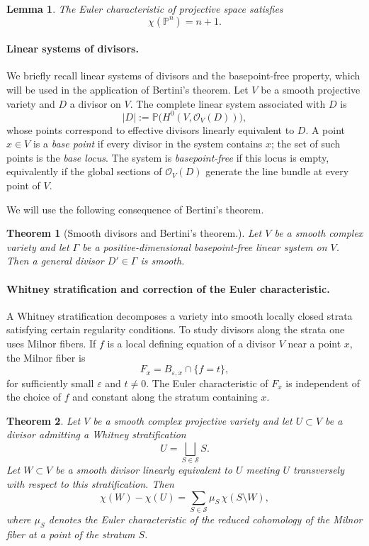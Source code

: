 \documentclass{article}
\newtheorem{theorem}{Theorem}
\newtheorem{lemma}{Lemma}
\newcommand{\PP}{\mathbb{P}}
\begin{document}
\begin{lemma}\cite{may1999concise}
The Euler characteristic of projective space satisfies
\[
\chi(\PP^n)=n+1 .
\]
\end{lemma}
\paragraph{Linear systems of divisors.}

We briefly recall linear systems of divisors and the basepoint-free property, which will be used in the application of Bertini’s theorem. 
Let $V$ be a smooth projective variety and $D$ a divisor on $V$. 
The complete linear system associated with $D$ is
\[
|D| := \mathbb{P}\bigl(H^0(V,\mathcal O_V(D))\bigr),
\]
whose points correspond to effective divisors linearly equivalent to $D$. A point~\mbox{$x\in V$} is a \emph{base point} if every divisor in the system contains $x$; the set of such points is the \emph{base locus}. 
The system is \emph{basepoint-free} if this locus is empty, equivalently if the global sections of $\mathcal O_V(D)$ generate the line bundle at every point of $V$. 

We will use the following consequence of Bertini’s theorem.

\begin{theorem}[Smooth divisors and Bertini's theorem.]
Let $V$ be a smooth complex variety and let $\Gamma$ be a positive-dimensional basepoint-free linear system on $V$. 
Then a general divisor $D' \in \Gamma$ is smooth.
\end{theorem}


\paragraph{Whitney stratification and correction of the Euler characteristic.}

A Whitney stratification decomposes a variety into smooth locally closed strata satisfying certain regularity conditions. 
To study divisors along the strata one uses Milnor fibers. 
If $f$ is a local defining equation of a divisor $V$ near a point $x$, the Milnor fiber is
\[
F_x = B_{\varepsilon,x}\cap\{f=t\},
\]
for sufficiently small $\varepsilon$ and $t\neq 0$. 
The Euler characteristic of $F_x$ is independent of the choice of $f$ and constant along the stratum containing $x$.

\begin{theorem}\cite{ParusinskiPragacz1995}\cite[Theorem 10.4.4]{MaximIntersection} 
\label{thm: correction of euler charachteristic of singular divisor}
Let $V$ be a smooth complex projective variety and let $U\subset V$ be a divisor admitting a Whitney stratification
\[
U=\bigsqcup_{S\in\mathscr S} S .
\]
Let $W\subset V$ be a smooth divisor linearly equivalent to $U$ meeting $U$ transversely with respect to this stratification. 
Then
\[\label{eq:C17}      
\chi(W)-\chi(U)
=
\sum_{S\in\mathscr S}\mu_S\,\chi(S\setminus W),
\]
where $\mu_S$ denotes the Euler characteristic of the reduced cohomology of the Milnor fiber at a point of the stratum $S$.
\end{theorem}
\end{document}

